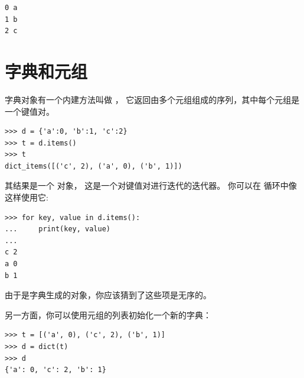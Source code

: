 {\begin{lstlisting}
0 a
1 b
2 c
\end{lstlisting}

%
        


\section{字典和元组}
\label{dictuple}
 
 


字典对象有一个内建方法叫做 \href{https://docs.python.org/3/library/stdtypes.html?highlight=items#dict.items}{  }， 它返回由多个元组组成的序列，其中每个元组是一个键值对。

\begin{lstlisting}
>>> d = {'a':0, 'b':1, 'c':2}
>>> t = d.items()
>>> t
dict_items([('c', 2), ('a', 0), ('b', 1)])
\end{lstlisting}

%

其结果是一个  对象， 这是一个对键值对进行迭代的迭代器。  
你可以在  循环中像这样使用它:

\begin{lstlisting}
>>> for key, value in d.items():
...     print(key, value)
...
c 2
a 0
b 1
\end{lstlisting}

%

由于是字典生成的对象，你应该猜到了这些项是无序的。


另一方面，你可以使用元组的列表初始化一个新的字典：

\begin{lstlisting}
>>> t = [('a', 0), ('c', 2), ('b', 1)]
>>> d = dict(t)
>>> d
{'a': 0, 'c': 2, 'b': 1}
\end{lstlisting}

}
